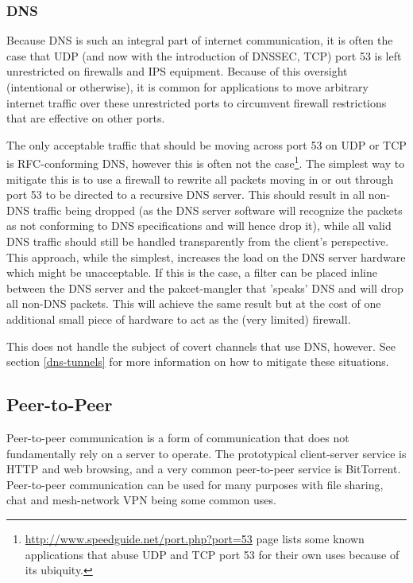 \documentclass{article}
\theoremstyle{remark}
\theoremstyle{definition}
\theoremstyle{definition}
\theoremstyle{definition}
\begin{document}
\subsubsection{DNS}
\label{dns-techniques}
Because DNS is such an integral part of internet communication, it is often the case that UDP (and now with the introduction of DNSSEC, TCP) port 53 is left unrestricted on firewalls and IPS equipment. Because of this oversight (intentional or otherwise), it is common for applications to move arbitrary internet traffic over these unrestricted ports to circumvent firewall restrictions that are effective on other ports.

The only acceptable traffic that should be moving across port 53 on UDP or TCP is RFC-conforming DNS, however this is often not the case\footnote{\url{http://www.speedguide.net/port.php?port=53} page lists some known applications that abuse UDP and TCP port 53 for their own uses because of its ubiquity.}. The simplest way to mitigate this is to use a firewall to rewrite all packets moving in or out through port 53 to be directed to a recursive DNS server. This should result in all non-DNS traffic being dropped (as the DNS server software will recognize the packets as not conforming to DNS specifications and will hence drop it), while all valid DNS traffic should still be handled transparently from the client's perspective. This approach, while the simplest, increases the load on the DNS server hardware which might be unacceptable. If this is the case, a filter can be placed inline between the DNS server and the pakcet-mangler that 'speaks' DNS and will drop all non-DNS packets. This will achieve the same result but at the cost of one additional small piece of hardware to act as the (very limited) firewall.

This does not handle the subject of covert channels that use DNS, however. See section \ref{dns-tunnels} for more information on how to mitigate these situations.

\subsection{Peer-to-Peer}
Peer-to-peer communication is a form of communication that does not fundamentally rely on a server to operate. The prototypical client-server service is HTTP and web browsing, and a very common peer-to-peer service is BitTorrent. Peer-to-peer communication can be used for many purposes with file sharing, chat and mesh-network VPN being some common uses.
\end{document}

